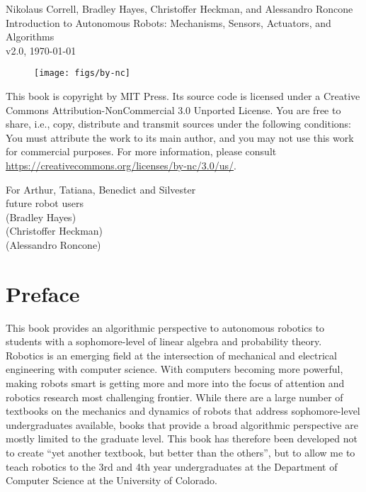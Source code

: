 \documentclass[paper=6.14in:9.21in,pagesize=pdftex,11pt,twoside,openright]{scrbook}
\begin{document}

\thispagestyle{empty}
\begin{flushleft}
Nikolaus Correll, Bradley Hayes, Christoffer Heckman, and Alessandro Roncone
\\Introduction to Autonomous Robots:  Mechanisms, Sensors, Actuators, and Algorithms
\\v2.0, \today\\
\end{flushleft}

\vfill

\begin{figure}[!h]
\texttt{[image: figs/by-nc]}
\end{figure}

This book is copyright by MIT Press. Its source code is licensed under a Creative Commons Attribution-NonCommercial 3.0 Unported License. You are free to share, i.e., copy, distribute and transmit sources under the following conditions: You must attribute the work to its main author, and you may not use this work for commercial purposes. For more information, please consult \url{https://creativecommons.org/licenses/by-nc/3.0/us/}.


\cleardoublepage
\thispagestyle{empty}
\vspace*{\fill}
\begin{center}
For Arthur, Tatiana, Benedict and Silvester\\
future robot users\\
(Bradley Hayes)
\\
(Christoffer Heckman)
\\
(Alessandro Roncone)
\end{center}
\vspace*{\fill}

\tableofcontents

\chapter*{Preface}
This book provides an algorithmic perspective to autonomous robotics to students with a sophomore-level of linear algebra and probability theory. Robotics is an emerging field at the intersection of mechanical and electrical engineering with computer science. With computers becoming more powerful, making robots smart is getting more and more into the focus of attention and robotics research most challenging frontier. While there are a large number of textbooks on the mechanics and dynamics of robots that address sophomore-level undergraduates available, books that provide a broad algorithmic perspective are mostly limited to the graduate level. This book has therefore been developed not to create ``yet another textbook, but better than the others'', but to allow me to teach robotics to the 3rd and 4th year undergraduates at the Department of Computer Science at the University of Colorado.
\end{document}
